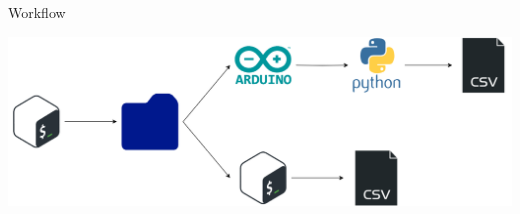 
\begin{frame}{Workflow}

\begin{center}
    \includegraphics[height=0.30\textwidth]{images/workflow.png}
\end{center}

\end{frame}
